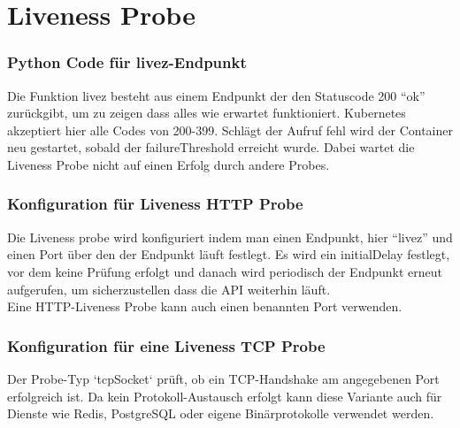 \section{Liveness Probe}
\subsubsection{Python Code für livez-Endpunkt}
Die Funktion livez besteht aus einem Endpunkt der den Statuscode 200 \enquote{ok} zurückgibt, um zu zeigen dass alles wie erwartet funktioniert.
Kubernetes akzeptiert hier alle Codes von 200-399. Schlägt der Aufruf fehl wird der Container neu gestartet, sobald der failureThreshold erreicht wurde.
Dabei wartet die Liveness Probe nicht auf einen Erfolg durch andere Probes.

\subsubsection{Konfiguration für Liveness HTTP Probe}
Die Liveness probe wird konfiguriert indem man einen Endpunkt, hier \enquote{livez} und einen Port über den der Endpunkt läuft festlegt.
Es wird ein initialDelay festlegt, vor dem keine Prüfung erfolgt und danach wird periodisch der Endpunkt erneut aufgerufen, um sicherzustellen dass die API weiterhin läuft.\\
Eine HTTP-Liveness Probe kann auch einen benannten Port verwenden.\\

\subsubsection{Konfiguration für eine Liveness TCP Probe}
Der Probe-Typ `tcpSocket` prüft, ob ein TCP-Handshake am angegebenen Port erfolgreich ist. Da kein Protokoll-Austausch erfolgt kann diese Variante auch für Dienste wie Redis, PostgreSQL oder eigene Binärprotokolle verwendet werden.

